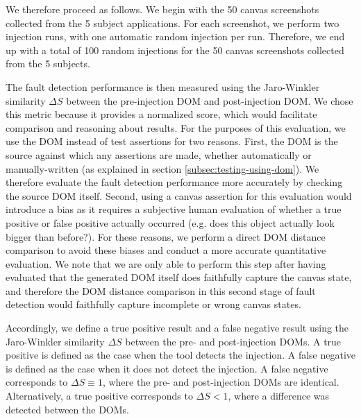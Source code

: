 We therefore proceed as follows. We begin with the 50 canvas screenshots collected from the 5 subject applications. For each screenshot, we perform two injection runs, with one automatic random injection per run. Therefore, we end up with a total of 100 random injections for the 50 canvas screenshots collected from the 5 subjects.

The fault detection performance is then measured using the Jaro-Winkler~\cite{winkler2006overview} similarity $\Delta S$ between the pre-injection DOM and post-injection DOM. We chose this metric because it provides a normalized score, which would facilitate comparison and reasoning about results. For the purposes of this evaluation, we use the DOM instead of test assertions for two reasons. First, the DOM is the source against which any assertions are made, whether automatically or manually-written (as explained in section \ref{subsec:testing-using-dom}). We therefore evaluate the fault detection performance more accurately by checking the source DOM itself. Second, using a canvas assertion for this evaluation would introduce a bias as it requires a subjective human evaluation of whether a true positive or false positive actually occurred (e.g. does this object actually look bigger than before?). For these reasons, we perform a direct DOM distance comparison to avoid these biases and conduct a more accurate quantitative evaluation. We note that we are only able to perform this step after 
having evaluated that the generated DOM itself does faithfully 
capture the canvas state, and therefore the DOM distance comparison in this second stage of fault detection would faithfully capture incomplete or wrong canvas states.   

Accordingly, we define a true positive result and a false negative result using the Jaro-Winkler similarity $\Delta S$ between the pre- and post-injection DOMs. A true positive is defined as the case when the tool detects the injection. A false negative is defined as the case when it does not detect the injection. A false negative corresponds to $\Delta S \equiv 1$, where the pre- and post-injection DOMs are identical. Alternatively, a true positive corresponds to $\Delta S < 1$, where a difference was detected between the DOMs.


